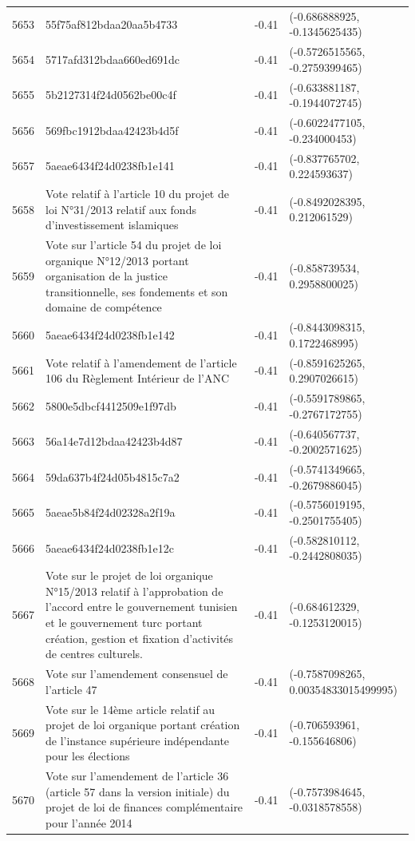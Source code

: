 \begin{table}[ht]
\begin{tabular}{rlrl}
  5653 & 55f75af812bdaa20aa5b4733 & -0.41 & (-0.686888925, -0.1345625435) \\ 
  5654 & 5717afd312bdaa660ed691dc & -0.41 & (-0.5726515565, -0.2759399465) \\ 
  5655 & 5b2127314f24d0562be00c4f & -0.41 & (-0.633881187, -0.1944072745) \\ 
  5656 & 569fbc1912bdaa42423b4d5f & -0.41 & (-0.6022477105, -0.234000453) \\ 
  5657 & 5aeae6434f24d0238fb1e141 & -0.41 & (-0.837765702, 0.224593637) \\ 
  5658 & Vote relatif à l'article 10 du projet de loi N°31/2013 relatif aux fonds d'investissement islamiques & -0.41 & (-0.8492028395, 0.212061529) \\ 
  5659 & Vote sur l'article 54 du projet de loi organique N°12/2013 portant organisation de la justice transitionnelle, ses fondements et son domaine de compétence & -0.41 & (-0.858739534, 0.2958800025) \\ 
  5660 & 5aeae6434f24d0238fb1e142 & -0.41 & (-0.8443098315, 0.1722468995) \\ 
  5661 & Vote relatif à l'amendement de l'article 106 du Règlement Intérieur de l'ANC & -0.41 & (-0.8591625265, 0.2907026615) \\ 
  5662 & 5800e5dbcf4412509e1f97db & -0.41 & (-0.5591789865, -0.2767172755) \\ 
  5663 & 56a14e7d12bdaa42423b4d87 & -0.41 & (-0.640567737, -0.2002571625) \\ 
  5664 & 59da637b4f24d05b4815c7a2 & -0.41 & (-0.5741349665, -0.2679886045) \\ 
  5665 & 5aeae5b84f24d02328a2f19a & -0.41 & (-0.5756019195, -0.2501755405) \\ 
  5666 & 5aeae6434f24d0238fb1e12c & -0.41 & (-0.582810112, -0.2442808035) \\ 
  5667 & Vote sur le projet de loi organique N°15/2013 relatif à l'approbation de l'accord entre le gouvernement tunisien et le gouvernement turc portant création, gestion et fixation d'activités de centres culturels. & -0.41 & (-0.684612329, -0.1253120015) \\ 
  5668 & Vote sur l'amendement consensuel de l'article 47 & -0.41 & (-0.7587098265, 0.00354833015499995) \\ 
  5669 & Vote sur le 14ème article relatif au projet de loi organique portant création de l'instance supérieure indépendante pour les élections & -0.41 & (-0.706593961, -0.155646806) \\ 
  5670 & Vote sur l'amendement de l'article 36 (article 57 dans la version initiale) du projet de loi de finances complémentaire pour l'année 2014 & -0.41 & (-0.7573984645, -0.0318578558) \\ 

\end{tabular}
\end{table}
